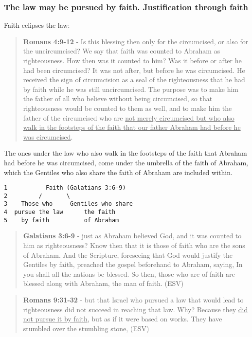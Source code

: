 \documentclass[11pt]{article}
\begin{document}
\subsubsection{The law may be pursued by faith. Justification through faith}
\label{sec:orgf33f883}

Faith eclipses the law:

\begin{quote}
\textbf{Romans 4:9-12} - Is this blessing then only for the circumcised, or also for the uncircumcised? We say that faith was counted to Abraham as righteousness. How then was it counted to him? Was it before or after he had been circumcised? It was not after, but before he was circumcised. He received the sign of circumcision as a seal of the righteousness that he had by faith while he was still uncircumcised. The purpose was to make him the father of all who believe without being circumcised, so that righteousness would be counted to them as well, and to make him the father of the circumcised who are \uline{not merely circumcised but who also walk in the footsteps of the faith that our father Abraham had before he was circumcised}.
\end{quote}

The ones under the law who also walk in the footsteps of the faith that Abraham had before he was circumcised, come under the umbrella of the faith of Abraham, which the Gentiles who also share the faith of Abraham are included within.

\begin{verbatim}
1           Faith (Galatians 3:6-9)
2         /       \
3    Those who     Gentiles who share
4  pursue the law      the faith
5    by faith          of Abraham
\end{verbatim}

\begin{quote}
\textbf{Galatians 3:6-9} -  just as Abraham believed God, and it was counted to him as righteousness?  Know then that it is those of faith who are the sons of Abraham.  And the Scripture, foreseeing that God would justify the Gentiles by faith, preached the gospel beforehand to Abraham, saying, In you shall all the nations be blessed.  So then, those who are of faith are blessed along with Abraham, the man of faith.  (ESV)
\end{quote}

\begin{quote}
\textbf{Romans 9:31-32} - but that Israel who pursued a law that would lead to righteousness did not succeed in reaching that law. Why? Because they \uline{did not pursue it by faith}, but as if it were based on works. They have stumbled over the stumbling stone, (ESV)
\end{quote}
\end{document}
